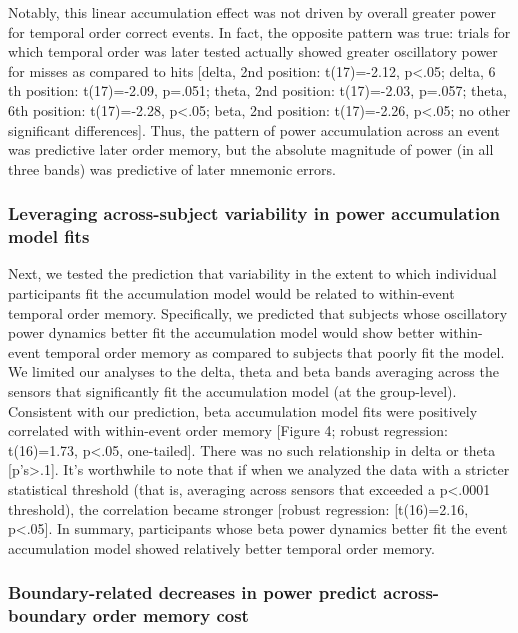 Notably, this linear accumulation effect was not driven by overall
greater power for temporal order correct events. In fact, the opposite
pattern was true: trials for which temporal order was later tested
actually showed greater oscillatory power for misses as compared to hits
{[}delta, 2nd position: t(17)=-2.12, p\textless{}.05; delta, 6 th
position: t(17)=-2.09, p=.051; theta, 2nd position: t(17)=-2.03, p=.057;
theta, 6th position: t(17)=-2.28, p\textless{}.05; beta, 2nd position:
t(17)=-2.26, p\textless{}.05; no other significant differences{]}. Thus,
the pattern of power accumulation across an event was predictive later
order memory, but the absolute magnitude of power (in all three bands)
was predictive of later mnemonic errors.

\subsubsection{Leveraging across-subject variability in power
accumulation model
fits}\label{leveraging-across-subject-variability-in-power-accumulation-model-fits}

Next, we tested the prediction that variability in the extent to which
individual participants fit the accumulation model would be related to
within-event temporal order memory. Specifically, we predicted that
subjects whose oscillatory power dynamics better fit the accumulation
model would show better within-event temporal order memory as compared
to subjects that poorly fit the model. We limited our analyses to the
delta, theta and beta bands averaging across the sensors that
significantly fit the accumulation model (at the group-level).
Consistent with our prediction, beta accumulation model fits were
positively correlated with within-event order memory {[}Figure 4; robust
regression: t(16)=1.73, p\textless{}.05, one-tailed{]}. There was no
such relationship in delta or theta {[}p's\textgreater{}.1{]}. It's
worthwhile to note that if when we analyzed the data with a stricter
statistical threshold (that is, averaging across sensors that exceeded a
p\textless{}.0001 threshold), the correlation became stronger {[}robust
regression: {[}t(16)=2.16, p\textless{}.05{]}. In summary, participants
whose beta power dynamics better fit the event accumulation model showed
relatively better temporal order memory.

\subsubsection{Boundary-related decreases in power predict
across-boundary order memory
cost}\label{boundary-related-decreases-in-power-predict-across-boundary-order-memory-cost}

